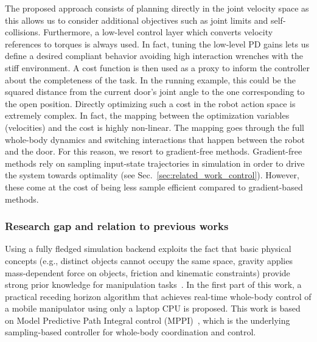 The proposed approach consists of planning directly in the joint velocity space as this allows us to consider additional objectives such as joint limits and self-collisions. Furthermore, a low-level control layer which converts velocity references to torques is always used. In fact, tuning the low-level PD gains lets us define a desired compliant behavior avoiding high interaction wrenches with the stiff environment. 
A cost function is then used as a proxy to inform the controller about the completeness of the task. In the running example, this could be the squared distance from the current door's joint angle to the one corresponding to the open position. 
Directly optimizing such a cost in the robot action space is extremely complex. In fact, the mapping between the optimization variables (velocities) and the cost is highly non-linear. The mapping goes through the full whole-body dynamics and switching interactions that happen between the robot and the door. For this reason, we resort to gradient-free methods. Gradient-free methods rely on sampling input-state trajectories in simulation in order to drive the system towards optimality (see Sec.~\ref{sec:related_work_control}). However, these come at the cost of being less sample efficient compared to gradient-based methods.

\subsubsection{Research gap and relation to previous works}
Using a fully fledged simulation backend exploits the fact that basic physical concepts (e.g., distinct objects cannot occupy the same space, gravity applies mass-dependent force on objects, friction and kinematic constraints) provide strong prior knowledge for manipulation tasks~\cite{kroemer2019review}. In the first part of this work, a practical receding horizon algorithm that achieves real-time whole-body control of a mobile manipulator using only a laptop CPU is proposed. This work is based on Model Predictive Path Integral control (MPPI)~\cite{williams_information_2017}, which is the underlying sampling-based controller for whole-body coordination and control.

